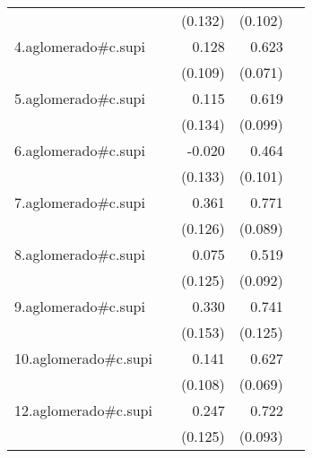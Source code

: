 {\begin{longtable}{l*{4}{D{.}{.}{-1}}}
            &                     &     (0.132)         &     (0.102)         &                     \\
\addlinespace
4.aglomerado#c.supi&                     &       0.128         &       0.623\sym{***}&                     \\
            &                     &     (0.109)         &     (0.071)         &                     \\
\addlinespace
5.aglomerado#c.supi&                     &       0.115         &       0.619\sym{***}&                     \\
            &                     &     (0.134)         &     (0.099)         &                     \\
\addlinespace
6.aglomerado#c.supi&                     &      -0.020         &       0.464\sym{***}&                     \\
            &                     &     (0.133)         &     (0.101)         &                     \\
\addlinespace
7.aglomerado#c.supi&                     &       0.361\sym{**} &       0.771\sym{***}&                     \\
            &                     &     (0.126)         &     (0.089)         &                     \\
\addlinespace
8.aglomerado#c.supi&                     &       0.075         &       0.519\sym{***}&                     \\
            &                     &     (0.125)         &     (0.092)         &                     \\
\addlinespace
9.aglomerado#c.supi&                     &       0.330\sym{*}  &       0.741\sym{***}&                     \\
            &                     &     (0.153)         &     (0.125)         &                     \\
\addlinespace
10.aglomerado#c.supi&                     &       0.141         &       0.627\sym{***}&                     \\
            &                     &     (0.108)         &     (0.069)         &                     \\
\addlinespace
12.aglomerado#c.supi&                     &       0.247\sym{*}  &       0.722\sym{***}&                     \\
            &                     &     (0.125)         &     (0.093)         &                     \\

\end{longtable}}
